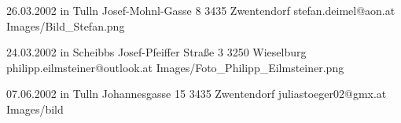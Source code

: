 
\begin{Diplomandenvorstellung}
		  {26.03.2002 in Tulln}
		  {Josef-Mohnl-Gasse 8}
		  {3435 Zwentendorf}
		  {
		  }
		  {stefan.deimel@aon.at}
		  {Images/Bild_Stefan.png}
\newpage	  

		  {24.03.2002 in Scheibbs}
		  {Josef-Pfeiffer Straße 3}
		  {3250 Wieselburg}
		  {
		  }
		  {philipp.eilmsteiner@outlook.at}
		  {Images/Foto_Philipp_Eilmsteiner.png}
\newpage

		  {07.06.2002 in Tulln}
		  {Johannesgasse 15}
		  {3435 Zwentendorf}
		  {
		  }
		  {juliastoeger02@gmx.at}
		  {Images/bild}
		  
\end{Diplomandenvorstellung}

